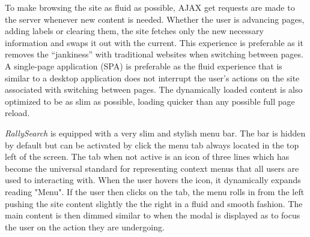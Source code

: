 \documentclass[msc,oneside]{ubcthesis}%
\begin{document}
To make browsing the site as fluid as possible, AJAX get requests are made to the server whenever new content is needed. Whether the user is advancing pages, adding labels or clearing them, the site fetches only the new necessary information and swaps it out with the current. This experience is preferable as it removes the ``jankiness'' with traditional websites when switching between pages. A single-page application (SPA) is preferable as the fluid experience that is similar to a desktop application does not interrupt the user's actions on the site associated with switching between pages. The dynamically loaded content is also optimized to be as slim as possible, loading quicker than any possible full page reload. 
\par
\textit{RallySearch} is equipped with a very slim and stylish menu bar. The bar is hidden by default but can be activated by click the menu tab always located in the top left of the screen. The tab when not active is an icon of three lines which has become the universal standard for representing context menus that all users are used to interacting with. When the user hovers the icon, it dynamically expands reading "Menu". If the user then clicks on the tab, the menu rolls in from the left pushing the site content slightly the the right in a fluid and smooth fashion. The main content is then dimmed similar to when the modal is displayed as to focus the user on the action they are undergoing.
\end{document}
